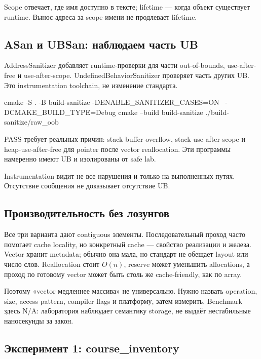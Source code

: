 Scope отвечает, где имя доступно в тексте; lifetime --- когда объект
существует runtime. Вынос адреса за scope имени не продлевает lifetime.

\subsection{ASan и UBSan: наблюдаем часть UB}

AddressSanitizer добавляет runtime-проверки для части out-of-bounds,
use-after-free и use-after-scope. UndefinedBehaviorSanitizer проверяет часть
других UB. Это instrumentation toolchain, не изменение стандарта.

\begin{shellcode}
cmake -S . -B build-sanitize -DENABLE_SANITIZER_CASES=ON \
  -DCMAKE_BUILD_TYPE=Debug
cmake --build build-sanitize
./build-sanitize/raw_oob
\end{shellcode}

PASS требует реальных причин: stack-buffer-overflow, stack-use-after-scope и
heap-use-after-free для pointer после vector reallocation. Эти программы
намеренно имеют UB и изолированы от safe lab.

\begin{warningbox}
Instrumentation видит не все нарушения и только на выполненных путях.
Отсутствие сообщения не доказывает отсутствие UB.
\end{warningbox}

\subsection{Производительность без лозунгов}

Все три варианта дают contiguous элементы. Последовательный проход часто
помогает cache locality, но конкретный cache --- свойство реализации и
железа. Vector хранит metadata; обычно она мала, но стандарт не обещает layout
или число слов. Reallocation стоит $O(n)$, reserve может уменьшить allocations,
а проход по готовому vector может быть столь же cache-friendly, как по array.

Поэтому «vector медленнее массива» не универсально. Нужно назвать operation,
size, access pattern, compiler flags и платформу, затем измерить. Benchmark
здесь N/A: лаборатория наблюдает семантику storage, не выдаёт нестабильные
наносекунды за закон.

\subsection{Эксперимент 1: course\_inventory}

